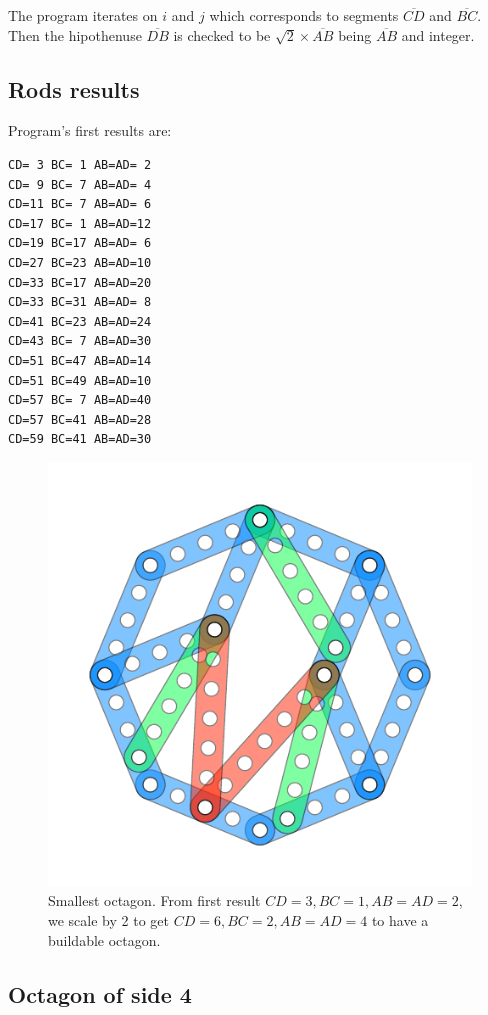 \documentclass[11pt]{article}
\begin{document}
The program iterates on $i$ and $j$ which corresponds to 
segments $\overline{CD}$ and $\overline{BC}$. Then the hipothenuse $\overline{DB}$ is checked
to be $\sqrt{2} \times \overline{AB}$ being $\overline{AB}$ and integer.

\subsection{Rods results}

Program's first results are:
\begin{lstlisting}
CD= 3 BC= 1 AB=AD= 2
CD= 9 BC= 7 AB=AD= 4
CD=11 BC= 7 AB=AD= 6
CD=17 BC= 1 AB=AD=12
CD=19 BC=17 AB=AD= 6
CD=27 BC=23 AB=AD=10
CD=33 BC=17 AB=AD=20
CD=33 BC=31 AB=AD= 8
CD=41 BC=23 AB=AD=24
CD=43 BC= 7 AB=AD=30
CD=51 BC=47 AB=AD=14
CD=51 BC=49 AB=AD=10
CD=57 BC= 7 AB=AD=40
CD=57 BC=41 AB=AD=28
CD=59 BC=41 AB=AD=30
\end{lstlisting}

\begin{figure}[htpb]
\centering
\includegraphics[]{figs/octagon-4}
\caption{Smallest octagon. From first result $CD=3, BC=1, AB=AD=2$,
we scale by 2 to get $CD=6, BC=2, AB=AD=4$ to have a buildable octagon.}
\label{fig:2}
\end{figure}

\subsection{Octagon of side 4}
\end{document}
